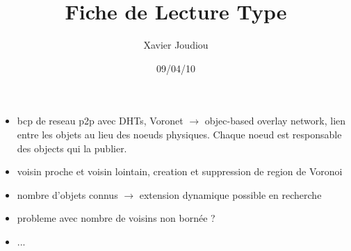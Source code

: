 \documentclass[11pt,a4paper]{article}
\title{Fiche de Lecture Type}
\author{Xavier Joudiou}
\date{09/04/10}
\begin{document}
	
  \begin{itemize}
  \renewcommand{\labelitemi}{$\Rightarrow$}
	\item bcp de reseau p2p avec DHTs, Voronet $\rightarrow$ objec-based overlay network, lien entre les objets au lieu des noeuds physiques. Chaque noeud est responsable des objects qui la publier.
	\item voisin proche et voisin lointain, creation et suppression de region de Voronoi
	\item nombre d'objets connus $\rightarrow$ extension dynamique possible en recherche
	\item probleme avec nombre de voisins non bornée ? 
	\item ...
  \end{itemize}
\end{document}
